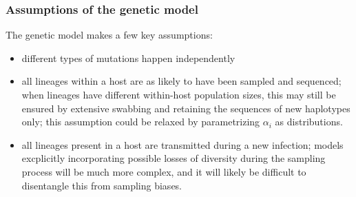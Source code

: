 \documentclass[10pt]{article}
\begin{document}
\subsubsection*{Assumptions of the genetic model}
The genetic model makes a few key assumptions:
\begin{itemize}
 \item different types of mutations happen independently
 \item all lineages within a host are as likely to have been sampled and sequenced; when lineages have different within-host population sizes, this may still be ensured by extensive swabbing and retaining the sequences of new haplotypes only; this assumption could be relaxed by parametrizing $\alpha_i$ as distributions.
 \item all lineages present in a host are transmitted during a new infection; models excplicitly incorporating possible losses of diversity during the sampling process will be much more complex, and it will likely be difficult to disentangle this from sampling biases.
\end{itemize}



% 

\end{document}
